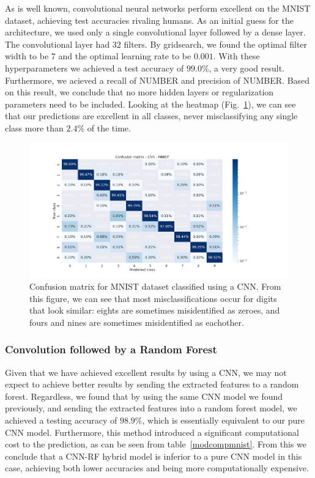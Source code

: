\documentclass[onecolumn,10pt,cleanfoot]{asme2ej}
\begin{document}
As is well known, convolutional neural networks perform excellent on the MNIST dataset, achieving test accuracies rivaling humans. As an initial guess for the architecture, we used only a single convolutional layer followed by a dense layer. The convolutional layer had $32$ filters. By gridsearch, we found the optimal filter width to be $7$ and the optimal learning rate to be $0.001$. With these hyperparameters we achieved a test accuracy of $99.0\%$, a very good result. Furthermore, we acieved a recall of NUMBER and precision of NUMBER. Based on this result, we conclude that no more hidden layers or regularization parameters need to be included. Looking at the heatmap (Fig.~\ref{mnistheatmap_cnn}), we can see that our predictions are excellent in all classes, never misclassifying any single class more than $2.4\%$ of the time.

\begin{figure}[H]
\centerline{\includegraphics[width=8in]{figure/conf_cnn_MNIST.png}}
\caption{Confusion matrix for MNIST dataset classified using a CNN. From this figure, we can see that most misclassifications occur for digits that look similar: eights are sometimes misidentified as zeroes, and fours and nines are sometimes misidentified as eachother.}
\label{mnistheatmap_cnn}
\end{figure}

\subsubsection{Convolution followed by a Random Forest}

Given that we have achieved excellent results by using a CNN, we may not expect to achieve better results by sending the extracted features to a random forest. Regardless, we found that by using the same CNN model we found previously, and sending the extracted features into a random forest model, we achieved a testing accuracy of $98.9\%$, which is essentially equivalent to our pure CNN model. Furthermore, this method introduced a significant computational cost to the prediction, as can be seen from table~\ref{modcompmnist}. From this we conclude that a CNN-RF hybrid model is inferior to a pure CNN model in this case, achieving both lower accuracies and being more computationally expensive.
\end{document}
